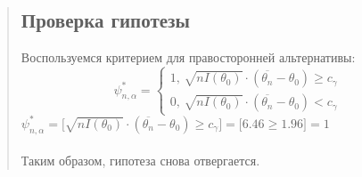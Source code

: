 \documentclass{article}
\begin{document}
\begin{quote}
\subsection{Проверка гипотезы}
	Воспользуемся критерием для правосторонней альтернативы: \\
	\Large
	\begin{equation*}
		\psi^{*}_{n, \alpha} = 
 	\begin{cases}
		1\text{, $\sqrt{nI(\theta_0)} \cdot (\overline{\theta_n} - \theta_0) \ge c_{\gamma}$}\\
		0\text{, $\sqrt{nI(\theta_0)} \cdot (\overline{\theta_n} - \theta_0) < c_{\gamma}$}
 	\end{cases}
	\end{equation*}
	$\psi^{*}_{n, \alpha} = \bigl[\sqrt{nI(\theta_0)} \cdot (\overline{\theta_n} - \theta_0) \ge c_{\gamma}\bigr] = \bigl[6.46 \ge 1.96\bigr] = 1$ \\ \\
	\large
	Таким образом, гипотеза снова отвергается.
\end{quote}
\end{document}
